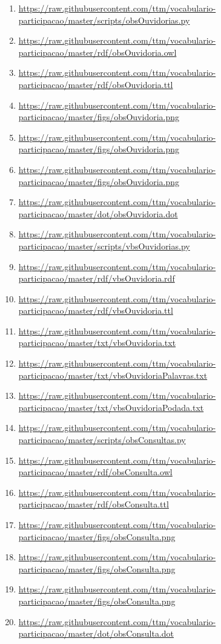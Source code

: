\documentclass[12pt]{article}
\begin{document}
{\begin{enumerate}
    \item \url{https://raw.githubusercontent.com/ttm/vocabulario-participacao/master/scripts/obsOuvidorias.py}\label{i:31}
    \item  \url{https://raw.githubusercontent.com/ttm/vocabulario-participacao/master/rdf/obsOuvidoria.owl}\label{i:32}
    \item  \url{https://raw.githubusercontent.com/ttm/vocabulario-participacao/master/rdf/obsOuvidoria.ttl}\label{i:33}
    \item \url{https://raw.githubusercontent.com/ttm/vocabulario-participacao/master/figs/obsOuvidoria.png}\label{i:34}
    \item \url{https://raw.githubusercontent.com/ttm/vocabulario-participacao/master/figs/obsOuvidoria.png}\label{i:35}
    \item \url{https://raw.githubusercontent.com/ttm/vocabulario-participacao/master/figs/obsOuvidoria.png}\label{i:36}
    \item  \url{https://raw.githubusercontent.com/ttm/vocabulario-participacao/master/dot/obsOuvidoria.dot}\label{i:37}

    \item \url{https://raw.githubusercontent.com/ttm/vocabulario-participacao/master/scripts/vbsOuvidorias.py}\label{i:38}
    \item \url{https://raw.githubusercontent.com/ttm/vocabulario-participacao/master/rdf/vbsOuvidoria.rdf}\label{i:39}
    \item \url{https://raw.githubusercontent.com/ttm/vocabulario-participacao/master/rdf/vbsOuvidoria.ttl}\label{i:40}
    \item \url{https://raw.githubusercontent.com/ttm/vocabulario-participacao/master/txt/vbsOuvidoria.txt}\label{i:41}
    \item \url{https://raw.githubusercontent.com/ttm/vocabulario-participacao/master/txt/vbsOuvidoriaPalavras.txt}\label{i:42}
    \item \url{https://raw.githubusercontent.com/ttm/vocabulario-participacao/master/txt/vbsOuvidoriaPodada.txt}\label{i:43}


 \item \url{https://raw.githubusercontent.com/ttm/vocabulario-participacao/master/scripts/obsConsultas.py}\label{i:44}
    \item  \url{https://raw.githubusercontent.com/ttm/vocabulario-participacao/master/rdf/obsConsulta.owl}\label{i:45}
    \item  \url{https://raw.githubusercontent.com/ttm/vocabulario-participacao/master/rdf/obsConsulta.ttl}\label{i:46}
    \item \url{https://raw.githubusercontent.com/ttm/vocabulario-participacao/master/figs/obsConsulta.png}\label{i:47}
    \item \url{https://raw.githubusercontent.com/ttm/vocabulario-participacao/master/figs/obsConsulta.png}\label{i:48}
    \item \url{https://raw.githubusercontent.com/ttm/vocabulario-participacao/master/figs/obsConsulta.png}\label{i:49}
    \item  \url{https://raw.githubusercontent.com/ttm/vocabulario-participacao/master/dot/obsConsulta.dot}\label{i:50}


\end{enumerate}}
\end{document}
